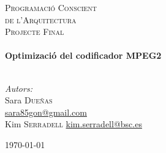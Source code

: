 
\begin{titlepage}
\begin{center}

\bigskip



\textsc{\LARGE Programació Conscient}\\[0.2cm]
\textsc{\LARGE de l'Arquitectura}\\[1.5cm]
\textsc{\Large Projecte Final}\\[0.5cm]


\HRule \\[0.4cm]
{ \huge \bfseries Optimizació del codificador MPEG2}\\[0.2cm]
\HRule \\[1.5cm]

\end{center}

\begin{minipage}{0.4\textwidth}
\begin{flushleft} \large
\emph{Autors:}\\
Sara \textsc{Dueñas}\\
\url{sara85gon@gmail.com}\\[0.5cm]
Kim \textsc{Serradell} 
\url{kim.serradell@bsc.es}
\end{flushleft}
\end{minipage}

\vfill
\begin{center}
{\large \today}
\end{center}


\end{titlepage}
